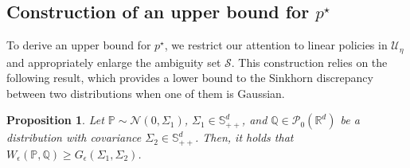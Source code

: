 \documentclass[letterpaper, 10 pt, conference]{ieeeconf}  %
\theoremstyle{ieeeconf}
\newtheorem{proposition}{Proposition}
\newcommand{\R}{\mathbb{R}}
\newcommand{\Prob}{\mathbb{P}}
\newcommand{\Q}{\mathbb{Q}}
\newcommand{\Symm}{\mathbb{S}}
\begin{document}
\subsection{Construction of an upper bound for \texorpdfstring{$p^\star$}{p*}}
To derive an upper bound for $p^\star$, we restrict our attention to linear policies in $\mathcal{U}_\eta$ and appropriately enlarge the ambiguity set $\mathcal{S}$. This construction relies on the following result, which provides a lower bound to the Sinkhorn discrepancy between two distributions when one of them is Gaussian.
\begin{proposition}
    Let $\Prob\sim \mathcal{N}(0, \Sigma_1)$, $\Sigma_1 \in \Symm_{++}^d$, and $\Q \in \mathcal{P}_0(\R^d)$ be a distribution with covariance $\Sigma_2 \in \Symm_{++}^d$. Then, it holds that $W_{\epsilon}(\Prob, \Q) \geq G_\epsilon(\Sigma_1, \Sigma_2)$.
    \label{proposition:Gelbrich}
\end{proposition}
\end{document}
